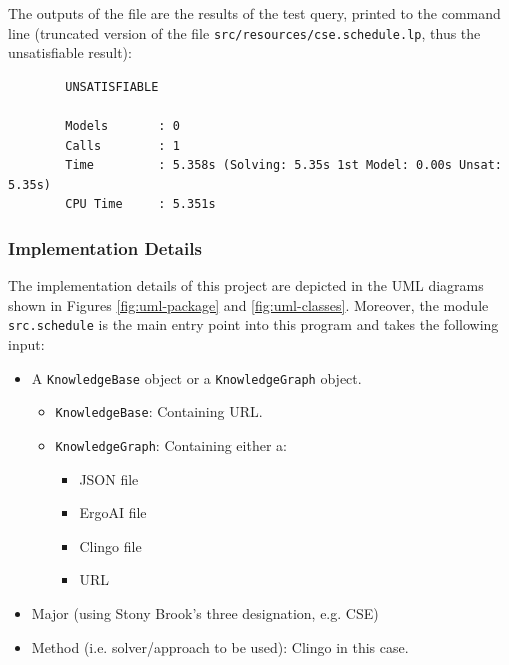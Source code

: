 \documentclass[12pt]{article}
\begin{document}
    The outputs of the file are the results of the test query, printed to the command line (truncated version of the file {\tt{src/resources/cse.schedule.lp}}, thus the unsatisfiable result): \\

    \begin{verbatim}
        UNSATISFIABLE
        
        Models       : 0
        Calls        : 1
        Time         : 5.358s (Solving: 5.35s 1st Model: 0.00s Unsat: 5.35s)
        CPU Time     : 5.351s
    \end{verbatim}

    
    

    \subsubsection{Implementation Details}
    \label{subsubsec:implementation}

    The implementation details of this project are depicted in the UML diagrams shown in Figures \ref{fig:uml-package} and \ref{fig:uml-classes}. Moreover, the module {\tt{src.schedule}} is the main entry point into this program and takes the following input:

    \begin{itemize}
        \item A {\tt{KnowledgeBase}} object or a  {\tt{KnowledgeGraph}} object.
        \begin{itemize}
            \item {\tt{KnowledgeBase}}: Containing URL.
            \item {\tt{KnowledgeGraph}}: Containing either a:
            \begin{itemize}
                \item JSON file
                \item ErgoAI file
                \item Clingo file
                \item URL
            \end{itemize}
        \end{itemize}
        \item Major (using Stony Brook's three designation, e.g. CSE)
        \item Method (i.e. solver/approach to be used): Clingo in this case.
    \end{itemize}
    
\end{document}
